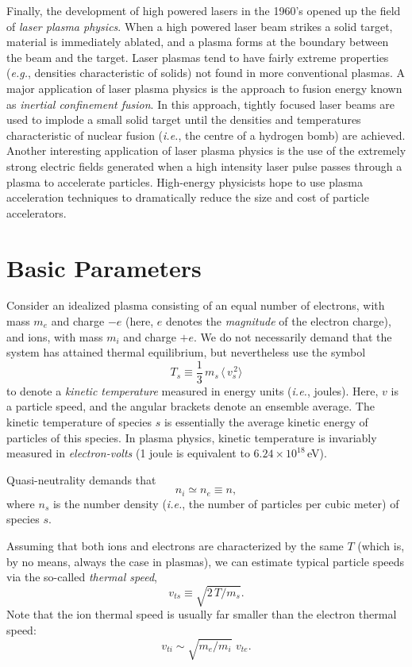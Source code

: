 Finally, the development of high powered lasers in the 1960's 
opened up the field of {\em laser plasma physics}. When a high powered laser
beam strikes a solid target, material is immediately ablated, and a plasma
forms at the boundary between the beam and the target. Laser plasmas tend to  have
fairly extreme properties ({\em e.g.}, densities
characteristic of solids) not found in more conventional plasmas. 
A major application of laser plasma physics is the approach to fusion
energy known as {\em inertial confinement fusion}. In this approach, 
tightly focused laser
beams are used to implode a small solid target until the densities and
temperatures characteristic of nuclear fusion ({\em i.e.},  the centre of
a hydrogen bomb) are achieved. Another interesting application
of  laser plasma physics is the
use of the extremely strong electric fields generated when a high intensity laser pulse passes
through a plasma to accelerate particles. High-energy physicists 
hope to use plasma acceleration
techniques to dramatically reduce the size and cost of particle accelerators.

\section{Basic Parameters}
Consider an idealized plasma consisting of an equal number of electrons, with
mass $m_e$ and charge $-e$ (here, $e$ denotes the {\em magnitude}\/ of the electron
charge), and ions, with  mass $m_i$ and charge $+e$. We do not necessarily
demand that the system has attained thermal equilibrium, but nevertheless use
the symbol
\begin{equation}
T_s \equiv \frac{1}{3} \,m_s\, \langle \,v_s^{\,2}\rangle
\end{equation}
to denote a {\em kinetic temperature}\/ measured in energy units ({\em i.e.}, joules).
Here, $v$ is a particle speed, and the angular brackets denote an
ensemble average. The kinetic temperature of species $s$ is essentially
the average kinetic energy of particles of
this species. In plasma physics, kinetic temperature
is invariably measured in {\em electron-volts}\/ (1 joule is equivalent to
$6.24\times 10^{18}$\,eV). 

Quasi-neutrality demands that
\begin{equation}
n_i \simeq n_e \equiv n,
\end{equation}
where $n_s$ is the number density ({\em i.e.}, the number of particles 
per cubic meter) of species $s$. 

Assuming that both ions and electrons are characterized by the
same $T$ (which is, by no means, always the case in plasmas), we can
estimate typical particle speeds via the so-called {\em thermal speed},
\begin{equation}
v_{ts} \equiv \sqrt{2\,T/m_s}.
\end{equation}
Note that the ion thermal speed is usually far smaller than the
electron thermal speed:
\begin{equation}
v_{ti} \sim \sqrt{m_e/m_i}\,\,v_{te}.
\end{equation}

